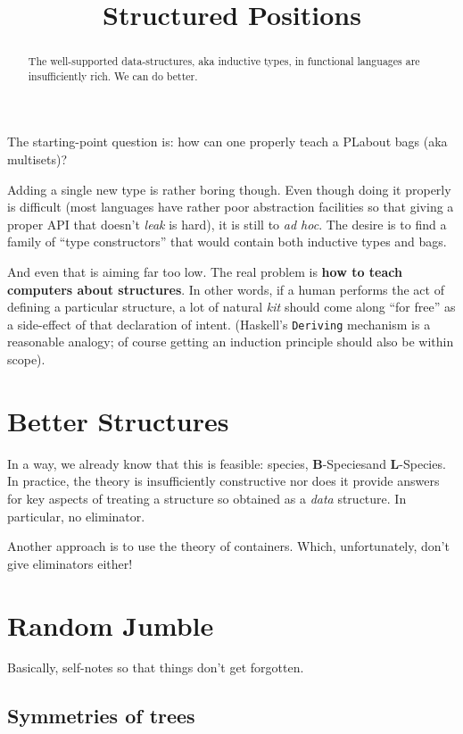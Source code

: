 \documentclass{article} %
\title{Structured Positions}
\author{}
\theoremstyle{plain}
\theoremstyle{definition}
\newcommand{\PL}{PL} %
\newcommand{\BSp}{\(\mathbf{B}\)-Species}
\newcommand{\LSp}{\(\mathbf{L}\)-Species}
\begin{document}
\maketitle
\begin{abstract}
The well-supported data-structures, aka inductive types, in functional
languages are insufficiently rich. We can do better.
\end{abstract}

The starting-point question is: how can one properly teach a \PL about
bags (aka multisets)?

Adding a single new type is rather boring though. Even though doing it
properly is difficult (most languages have rather poor abstraction facilities
so that giving a proper API that doesn't \emph{leak} is hard), it is still
to \textit{ad hoc}. The desire is to find a family of ``type constructors''
that would contain both inductive types and bags.

And even that is aiming far too low. The real problem is 
\textbf{how to teach computers about structures}. In other words, if a
human performs the act of defining a particular structure, a lot of
natural \emph{kit} should come along ``for free'' as a side-effect of
that declaration of intent. (Haskell's \texttt{Deriving} mechanism is
a reasonable analogy; of course getting an induction principle should also
be within scope).

\section{Better Structures}

In a way, we already know that this is  feasible:
species, \BSp and \LSp. In practice, the theory is insufficiently
constructive nor does it provide answers for key aspects of treating
a structure so obtained as a \emph{data} structure. In particular, no
eliminator.

Another approach is to use the theory of containers. Which, unfortunately,
don't give eliminators either!

\section{Random Jumble}

Basically, self-notes so that things don't get forgotten.

\subsection{Symmetries of trees}
\label{sec:sym-trees}
\end{document}
